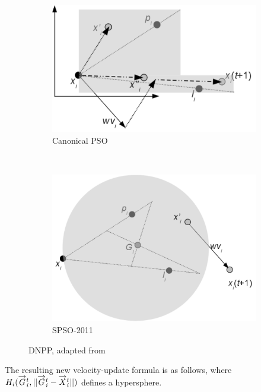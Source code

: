 \documentclass{csfourzero}
\newcommand{\rarrow}[1]{\overrightarrow{#1\vphantom{b}}}
\begin{document}
\begin{figure}
  \centering
  \begin{subfigure}[b]{0.4\textwidth}
    \includegraphics[width=\textwidth]{dnpp_canonical.png}
    \caption{Canonical PSO}
    \label{fig:dnpp_canonical}
  \end{subfigure}
  ~
  \begin{subfigure}[b]{0.4\textwidth}
    \includegraphics[width=\textwidth]{dnpp_spso11.png}
    \caption{SPSO-2011}
    \label{fig:dnpp_spso11}
  \end{subfigure}
  \caption{DNPP, adapted from~\cite{ZambranoBigiarini:2013dl}}
  \label{fig:dnpp}
\end{figure}

The resulting new velocity-update formula is as follows, where
$H_i(\rarrow{G}_i^t,||\rarrow{G}_i^t - \rarrow{X}_i^t||)$ defines a hypersphere.
\end{document}
